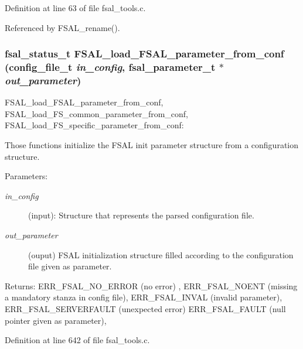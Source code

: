 Definition at line 63 of file fsal\_\-tools.c.

Referenced by FSAL\_\-rename().
\subsubsection[{FSAL\_\-load\_\-FSAL\_\-parameter\_\-from\_\-conf}]{\setlength{\rightskip}{0pt plus 5cm}fsal\_\-status\_\-t FSAL\_\-load\_\-FSAL\_\-parameter\_\-from\_\-conf (config\_\-file\_\-t {\em in\_\-config}, \/  fsal\_\-parameter\_\-t $\ast$ {\em out\_\-parameter})}\label{fsal__tools_8c_38fe03c0aa0fa100e90f3c0f8698c95e}


FSAL\_\-load\_\-FSAL\_\-parameter\_\-from\_\-conf, FSAL\_\-load\_\-FS\_\-common\_\-parameter\_\-from\_\-conf, FSAL\_\-load\_\-FS\_\-specific\_\-parameter\_\-from\_\-conf:

Those functions initialize the FSAL init parameter structure from a configuration structure.

\begin{Desc}
\item[Parameters:]
\begin{description}
\item[{\em in\_\-config}](input): Structure that represents the parsed configuration file. \item[{\em out\_\-parameter}](ouput) FSAL initialization structure filled according to the configuration file given as parameter.\end{description}
\end{Desc}
\begin{Desc}
\item[Returns:]ERR\_\-FSAL\_\-NO\_\-ERROR (no error) , ERR\_\-FSAL\_\-NOENT (missing a mandatory stanza in config file), ERR\_\-FSAL\_\-INVAL (invalid parameter), ERR\_\-FSAL\_\-SERVERFAULT (unexpected error) ERR\_\-FSAL\_\-FAULT (null pointer given as parameter), \end{Desc}


Definition at line 642 of file fsal\_\-tools.c.
